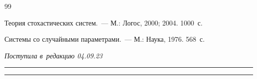 {{\begin{thebibliography}{99}






Теория стохастических систем.~--- М.: Логос, 2000; 2004. 1000~с.








Системы со случайными параметрами.~--- М.: Наука, 1976. 568~с.

   \end{thebibliography}

} }







\vspace*{-6pt}



\hfill{\small\textit{Поступила в~редакцию 04.09.23}}



\vspace*{8pt}



\hrule



\vspace*{2pt}





\hrule












\def\tit{ANALYTICAL MODELING OF STOCHASTIC SYSTEMS WITH~RANDOM PARAMETERS AND~UNSOLVED DERIVATIVES}







\def\titkol{Analytical modeling of stochastic systems with random parameters and unsolved derivatives}



